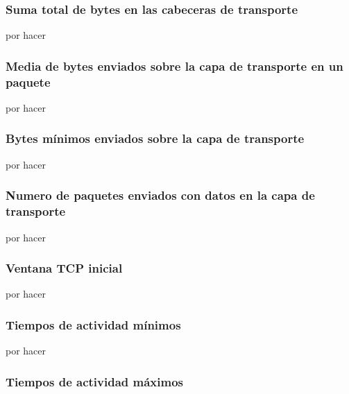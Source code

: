 
\subsubsection{Suma total de bytes en las cabeceras de transporte}

por hacer

\subsubsection{Media de bytes enviados sobre la capa de transporte en un paquete}

por hacer

\subsubsection{Bytes mínimos enviados sobre la capa de transporte}

por hacer

\subsubsection{Numero de paquetes enviados con datos en la capa de transporte}

por hacer

\subsubsection{Ventana TCP inicial}

por hacer

\subsubsection{Tiempos de actividad mínimos}

por hacer

\subsubsection{Tiempos de actividad máximos}

